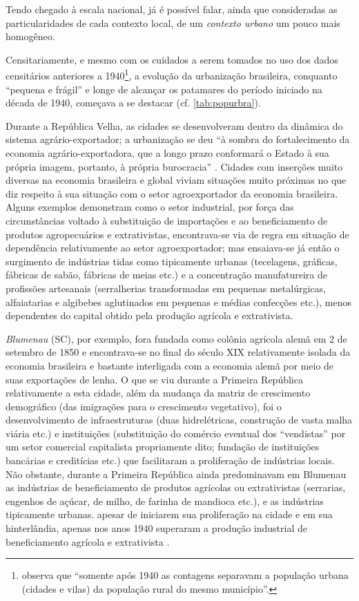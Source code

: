 Tendo chegado à escala nacional, já é possível falar, ainda que consideradas as particularidades de cada contexto local, de um \textit{contexto urbano} um pouco mais homogêneo.

Censitariamente, e mesmo com os cuidados a serem tomados no uso dos dados censitários anteriores a 1940\footnote{ observa que ``somente após 1940 as contagens separavam a população urbana (cidades e vilas) da população rural do mesmo município''.}, a evolução da urbanização brasileira, conquanto ``pequena e frágil'' \cite[p.~303]{suzigan_polgov_2001} e longe de alcançar os patamares do período iniciado na década de 1940, começava a se destacar (cf. \autoref{tab:popurbra}).



Durante a República Velha, as cidades se desenvolveram dentro da dinâmica do sistema agrário-exportador; a urbanização se deu ``à sombra do fortalecimento da economia agrário-exportadora, que a longo prazo conformará o Estado à sua própria imagem, portanto, à própria burocracia''  \cite[p.~22-23]{pinheiro_clamed_1977}. Cidades com inserções muito diversas na economia brasileira e global viviam situações muito próximas no que diz respeito à sua situação com o setor agroexportador da economia brasileira. Alguns exemplos demonstram como o setor industrial, por força das circunstâncias voltado à substituição de importações e ao beneficiamento de produtos agropecuários e extrativistas, encontrava-se via de regra em situação de dependência relativamente ao setor agroexportador; mas ensaiava-se já então o surgimento de indústrias tidas como tipicamente urbanas (tecelagens, gráficas, fábricas de sabão, fábricas de meias etc.) e a concentração manufatureira de profissões artesanais (serralherias transformadas em pequenas metalúrgicas, alfaiatarias e algibebes aglutinados em pequenas e médias confecções etc.), menos dependentes do capital obtido pela produção agrícola e extrativista.

\textit{Blumenau} (SC), por exemplo, fora fundada como colônia agrícola alemã em 2 de setembro de 1850 e encontrava-se no final do século XIX relativamente isolada da economia brasileira e bastante interligada com a economia alemã por meio de suas exportações de lenha. O que se viu durante a Primeira República relativamente a esta cidade, além da mudança da matriz de crescimento demográfico (das imigrações para o crescimento vegetativo), foi o desenvolvimento de infraestruturas (duas hidrelétricas, construção de vasta malha viária etc.) e instituições (substituição do comércio eventual dos ``vendistas'' por um setor comercial capitalista propriamente dito; fundação de instituições bancárias e creditícias etc.) que facilitaram a proliferação de indústrias locais. Não obstante, durante a Primeira República ainda predominavam em Blumenau as indústrias de beneficiamento de produtos agrícolas ou extrativistas (serrarias, engenhos de açúcar, de milho, de farinha de mandioca etc.), e as indústrias tipicamente urbanas. apesar de iniciarem sua proliferação na cidade e em sua hinterlândia, apenas nos anos 1940 superaram a produção industrial de beneficiamento agrícola e extrativista \cite[p.~111-130]{singer_evourb_1968}. 

